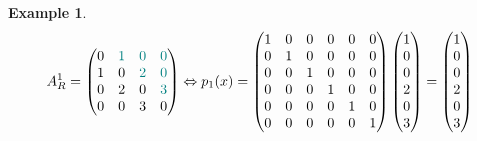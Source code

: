\documentclass[11pt,a4paper,openright,oneside]{book}
\numberwithin{equation}{section}
\newtheorem{example0}[defn0]{Example}
\newenvironment{example}{ \begin{example0}\rm}{\end{example0}}
\begin{document}
{\begin{example}
\iffalse
$$A^1_R = \begin{pmatrix}
    0 & {\color{teal} 1} & {\color{teal} 0} & {\color{teal} 0} \\
    1 & 0 & {\color{teal}2} & {\color{teal} 0} \\
0 & 2 & 0 & {\color{teal}3} \\
        0 & 0 & 3 & 0 \\
    \end{pmatrix} \Leftrightarrow p_1(x) = \begin{pmatrix}
        1 & 0 & 0 & 0 & 0 & 0 \\
        0 & 1 & 0 & 0 & 0 & 0 \\
        0 & 0 & 1 & 0 & 0 & 0 \\
        0 & 0 & 0 & 1 & 0 & 0 \\
        0 & 0 & 0 & 0 & 1 & 0 \\
        0 & 0 & 0 & 0 & 0 & 1 \\
        \end{pmatrix} \begin{pmatrix}
        1 \\ 0 \\ 0 \\ 2 \\ 0 \\ 3
        \end{pmatrix} = \begin{pmatrix}
        1 \\ 0 \\ 0 \\ 2 \\ 0 \\ 3
    \end{pmatrix}$$


\end{example}}
\end{document}
